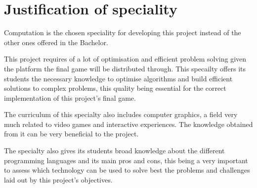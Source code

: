 \chapter{Justification of speciality}

Computation is the chosen speciality for developing this project instead of
the other ones offered in the Bachelor.

This project requires of a lot of optimisation and efficient problem solving
given the platform the final game will be distributed through. This specailty
offers its students the necessary knowledge to optimise algorithms and 
build efficient solutions to complex problems, this quality being essential
for the correct implementation of this project's final game.

The curriculum of this specialty also includes computer graphics, a field
very much related to video games and interactive experiences. The knowledge
obtained from it can be very beneficial to the project.

The specialty also gives its students broad knowledge about the different
programming languages and its main pros and cons, this being a very important
to assess which technology can be used to solve best the problems and challenges
laid out by this project's objectives.
